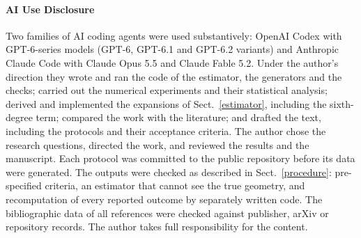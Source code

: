 \documentclass[11pt,a4paper]{article}
\begin{document}
\paragraph{AI Use Disclosure} Two families of AI coding agents were used
substantively: OpenAI Codex with GPT-6-series models (GPT-6, GPT-6.1 and
GPT-6.2 variants) and Anthropic Claude Code with Claude Opus 5.5 and Claude
Fable 5.2. Under the author's direction they wrote and ran the code of the
estimator, the generators and the checks; carried out the numerical
experiments and their statistical analysis; derived and implemented the
expansions of Sect.~\ref{estimator}, including the sixth-degree term;
compared the work with the literature; and drafted the text, including the
protocols and their acceptance criteria. The author chose the research
questions, directed the work, and reviewed the results and the manuscript.
Each protocol was committed to the public repository before its data were
generated. The outputs were checked as described in Sect.~\ref{procedure}:
pre-specified criteria, an estimator that cannot see the true geometry, and
recomputation of every reported outcome by separately written code. The
bibliographic data of all references were checked against publisher, arXiv
or repository records. The author takes full responsibility for the
content.
\end{document}
